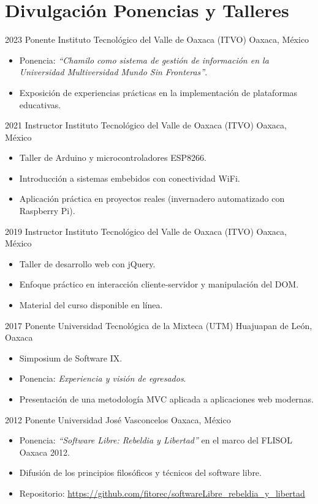 \section{Divulgación Ponencias y Talleres}

\cventry
{2023}
{Ponente}
{Instituto Tecnológico del Valle de Oaxaca (ITVO)}
{Oaxaca, México}
{}
{
\begin{itemize}
  \item Ponencia: \textit{``Chamilo como sistema de gestión de información en la Universidad Multiversidad Mundo Sin Fronteras''}.
  \item Exposición de experiencias prácticas en la implementación de plataformas educativas.
\end{itemize}
}

\cventry
{2021}
{Instructor}
{Instituto Tecnológico del Valle de Oaxaca (ITVO)}
{Oaxaca, México}
{}
{
\begin{itemize}
  \item Taller de Arduino y microcontroladores ESP8266.
  \item Introducción a sistemas embebidos con conectividad WiFi.
  \item Aplicación práctica en proyectos reales (invernadero automatizado con Raspberry Pi).
\end{itemize}
}

\cventry
{2019}
{Instructor}
{Instituto Tecnológico del Valle de Oaxaca (ITVO)}
{Oaxaca, México}
{}
{
\begin{itemize}
  \item Taller de desarrollo web con jQuery.
  \item Enfoque práctico en interacción cliente-servidor y manipulación del DOM.
  \item Material del curso disponible en línea.
\end{itemize}
}

\cventry
{2017}
{Ponente}
{Universidad Tecnológica de la Mixteca (UTM)}
{Huajuapan de León, Oaxaca}
{}
{
\begin{itemize}
  \item Simposium de Software IX.
  \item Ponencia: \textit{Experiencia y visión de egresados}.
  \item Presentación de una metodología MVC aplicada a aplicaciones web modernas.
\end{itemize}
}

\cventry
{2012}
{Ponente}
{Universidad José Vasconcelos}
{Oaxaca, México}
{}
{
\begin{itemize}
  \item Ponencia: \textit{``Software Libre: Rebeldia y Libertad''} en el marco del FLISOL Oaxaca 2012.
  \item Difusión de los principios filosóficos y técnicos del software libre.
  \item Repositorio: \url{https://github.com/fitorec/softwareLibre_rebeldia_y_libertad}
\end{itemize}
}

